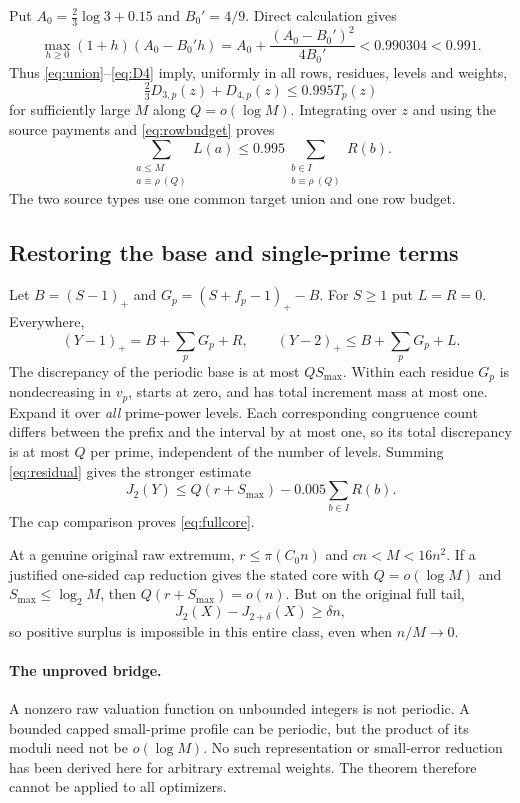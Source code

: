 \documentclass[11pt,a4paper]{article}
\begin{document}
Put $A_0=\frac23\log3+0.15$ and $B_0'=4/9$. Direct calculation gives
\[
 \max_{h\ge0}(1+h)(A_0-B_0'h)
 =A_0+\frac{(A_0-B_0')^2}{4B_0'}<0.990304<0.991.
\]
Thus \eqref{eq:union}--\eqref{eq:D4} imply, uniformly in all rows,
residues, levels and weights,
\[
 \tfrac23D_{3,p}(z)+D_{4,p}(z)\le0.995T_p(z)
\]
for sufficiently large $M$ along $Q=o(\log M)$. Integrating over
$z$ and using the source payments and \eqref{eq:rowbudget} proves
\begin{equation}
 \sum_{\substack{a\le M\\a\equiv\rho\ (Q)}}L(a)
 \le0.995\sum_{\substack{b\in I\\b\equiv\rho\ (Q)}}R(b).
                                                               \label{eq:residual}
\end{equation}
The two source types use one common target union and one row budget.

\subsection{Restoring the base and single-prime terms}
Let $B=(S-1)_+$ and
$G_p=(S+f_p-1)_+-B$. For $S\ge1$ put $L=R=0$. Everywhere,
\[
 (Y-1)_+=B+\sum_pG_p+R,\qquad
 (Y-2)_+\le B+\sum_pG_p+L.
\]
The discrepancy of the periodic base is at most $QS_{\max}$.
Within each residue $G_p$ is nondecreasing in $v_p$, starts at zero,
and has total increment mass at most one. Expand it over \emph{all}
prime-power levels. Each corresponding congruence count differs between
the prefix and the interval by at most one, so its total discrepancy is
at most $Q$ per prime, independent of the number of levels. Summing
\eqref{eq:residual} gives the stronger estimate
\[
 J_2(Y)\le Q(r+S_{\max})-0.005\sum_{b\in I}R(b).
\]
The cap comparison proves \eqref{eq:fullcore}.

At a genuine original raw extremum, $r\le\pi(C_0n)$ and
$cn<M<16n^2$. If a justified one-sided cap reduction gives the stated
core with $Q=o(\log M)$ and $S_{\max}\le\log_2M$, then
$Q(r+S_{\max})=o(n)$. But on the original full tail,
\[
 J_2(X)-J_{2+\delta}(X)\ge\delta n,
\]
so positive surplus is impossible in this entire class, even when
$n/M\to0$.

\paragraph{The unproved bridge.}
A nonzero raw valuation function on unbounded integers is not periodic.
A bounded capped small-prime profile can be periodic, but the product
of its moduli need not be $o(\log M)$. No such representation or
small-error reduction has been derived here for arbitrary extremal
weights. The theorem therefore cannot be applied to all optimizers.
\end{document}
